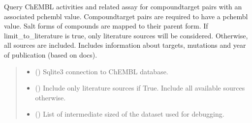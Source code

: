 \documentclass[letterpaper,10pt,english]{sphinxmanual}
\begin{document}
\begin{fulllineitems}
\label{\detokenize{get_activity_ct_pairs:get_activity_ct_pairs.get_compound_target_pairs_with_pchembl}}
\pysigstartsignatures
{}
\pysigstopsignatures
\sphinxAtStartPar
Query ChEMBL activities and related assay for compound\sphinxhyphen{}target pairs
with an associated pchembl value.
Compound\sphinxhyphen{}target pairs are required to have a pchembl value.
Salt forms of compounds are mapped to their parent form.
If limit\_to\_literature is true, only literature sources will be considered.
Otherwise, all sources are included.
Includes information about targets, mutations and year of publication (based on docs).
\begin{quote}\begin{description}
\begin{itemize}
\item {} 
\sphinxAtStartPar
{} () \textendash{} Sqlite3 connection to ChEMBL database.

\item {} 
\sphinxAtStartPar
{} () \textendash{} Include only literature sources if True.
Include all available sources otherwise.

\item {} 
\sphinxAtStartPar
{} (\sphinxstyleliteralemphasis{\sphinxupquote{{[}}}\sphinxstyleliteralemphasis{\sphinxupquote{{[}}}\sphinxstyleliteralemphasis{\sphinxupquote{{]}}}\sphinxstyleliteralemphasis{\sphinxupquote{, }}\sphinxstyleliteralemphasis{\sphinxupquote{{[}}}\sphinxstyleliteralemphasis{\sphinxupquote{{]}}}\sphinxstyleliteralemphasis{\sphinxupquote{{]}}}) \textendash{} List of intermediate sized of the dataset used for debugging.


\end{itemize}
\end{description}
\end{quote}
\end{fulllineitems}
\end{document}
